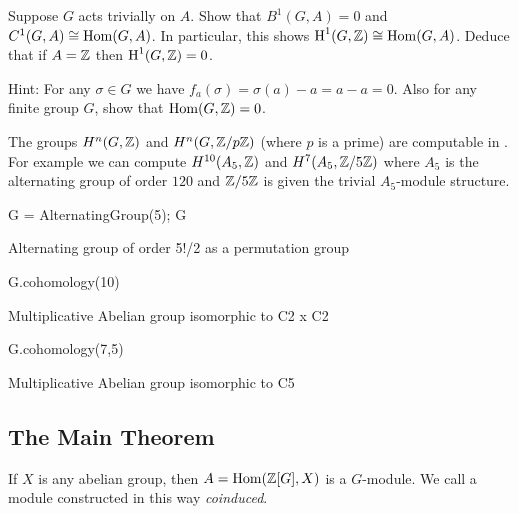 \begin{exercise}\label{ex:H1hom}
	Suppose $G$ acts trivially on $A$.
	Show that $B^1(G,A)=0$ and $C^1(G,A) \cong \operatorname{Hom}(G,A)$.
	In particular, this shows $\operatorname{H}^1(G,\mathbb{Z}) \cong \operatorname{Hom}(G,A)$.
	Deduce that if $A = \mathbb{Z}$ then $\operatorname{H}^1(G,\mathbb{Z}) = 0$.
	
	Hint: For any $\sigma\in G$ we have
	$f_a(\sigma) = \sigma(a) - a = a - a = 0$.
	Also for any finite group $G$, show that $\operatorname{Hom}(G,\mathbb{Z}) = 0$.

\end{exercise}

\begin{example}
	The groups $H^n(G,\mathbb{Z})$ and $H^n(G,\mathbb{Z}/p\mathbb{Z})$ (where $p$ is a prime)
	are computable in \sage. For example we can compute $H^{10}(A_5,\mathbb{Z})$
	and $H^{7}(A_5,\mathbb{Z}/5\mathbb{Z})$ where $A_5$ is the alternating group of
	order $120$ and $\mathbb{Z}/5\mathbb{Z}$ is given the trivial $A_5$-module structure.
\begin{sagecode}
\begin{sagecell}
G = AlternatingGroup(5); G
\end{sagecell}
\begin{sageout}
Alternating group of order 5!/2 as a permutation group
\end{sageout}
\begin{sagecell}
G.cohomology(10)
\end{sagecell}
\begin{sageout}
Multiplicative Abelian group isomorphic to C2 x C2
\end{sageout}
\begin{sagecell}
G.cohomology(7,5)
\end{sagecell}
\begin{sageout}
Multiplicative Abelian group isomorphic to C5
\end{sageout}
\end{sagecode}
\end{example}

\subsection{The Main Theorem}

\begin{definition}
	If $X$ is any abelian group, then $A = \operatorname{Hom}(\mathbb{Z}[G], X)$
	is a $G$-module. We call a module constructed in this
	way \emph{coinduced}.
\end{definition}

